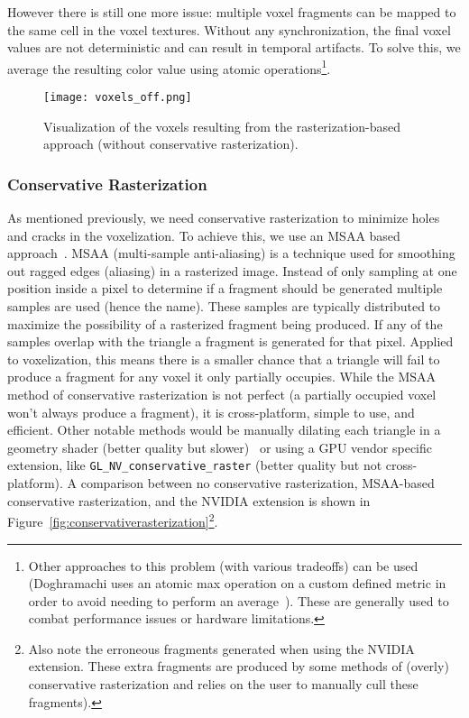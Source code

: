 However there is still one more issue: multiple voxel fragments can be mapped to the same cell in the voxel textures. Without any synchronization, the final voxel values are not deterministic and can result in temporal artifacts. To solve this, we average the resulting color value using atomic operations\footnote{Other approaches to this problem (with various tradeoffs) can be used (Doghramachi uses an atomic max operation on a custom defined metric in order to avoid needing to perform an average~\cite{doghramachi2013rasterized}). These are generally used to combat performance issues or hardware limitations.}.

\begin{figure}[h]
\centering
    \texttt{[image: voxels\_off.png]}
    \caption{Visualization of the voxels resulting from the rasterization-based approach (without conservative rasterization).}
    \label{fig:voxels_off}
\end{figure}

\subsubsection{Conservative Rasterization}
As mentioned previously, we need conservative rasterization to minimize holes and cracks in the voxelization. To achieve this, we use an MSAA based approach~\cite{takeshige2015basics}. MSAA (multi-sample anti-aliasing) is a technique used for smoothing out ragged edges (aliasing) in a rasterized image. Instead of only sampling at one position inside a pixel to determine if a fragment should be generated multiple samples are used (hence the name). These samples are typically distributed to maximize the possibility of a rasterized fragment being produced. If any of the samples overlap with the triangle a fragment is generated for that pixel. Applied to voxelization, this means there is a smaller chance that a triangle will fail to produce a fragment for any voxel it only partially occupies. While the MSAA method of conservative rasterization is not perfect (a partially occupied voxel won't always produce a fragment), it is cross-platform, simple to use, and efficient. Other notable methods would be manually dilating each triangle in a geometry shader (better quality but slower)~\cite{akenine2005conservative} or using a GPU vendor specific extension, like \verb#GL_NV_conservative_raster# (better quality but not cross-platform). A comparison between no conservative rasterization, MSAA-based conservative rasterization, and the NVIDIA extension is shown in Figure~\ref{fig:conservativerasterization}\footnote{Also note the erroneous fragments generated when using the NVIDIA extension. These extra fragments are produced by some methods of (overly) conservative rasterization and relies on the user to manually cull these fragments).}.

